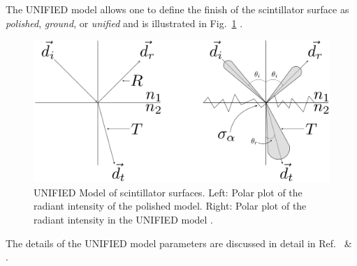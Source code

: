 The UNIFIED model allows one to define the finish of the scintillator surface as \textit{polished}, \textit{ground}, or \textit{unified} and is illustrated in Fig.~\ref{fig:polished_vs_ground} \cite{scint_surface_sim}.
	\begin{figure}[!htb]
	\centering
	\includegraphics[width=1.0\columnwidth]{simulation/figs/st_unified_sim_v2}
	\caption{UNIFIED Model of scintillator surfaces.  Left: Polar plot of the radiant intensity of the polished model.  Right: Polar plot of the radiant intensity in the UNIFIED model \cite{scint_surface_sim}.}
	\label{fig:polished_vs_ground}
	\end{figure}
The details of the UNIFIED model parameters are discussed in detail in Ref.~\cite{pooser16} \& \cite{scint_surface_sim}.



